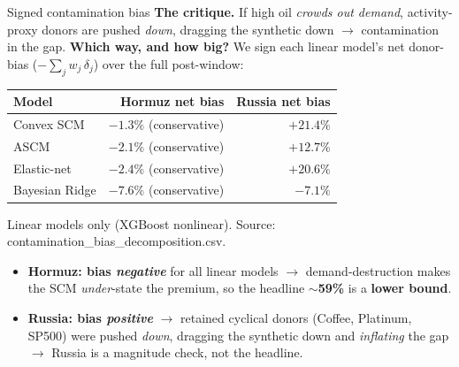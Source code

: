 \documentclass[aspectratio=169,11pt]{beamer}
\newcommand{\smalltext}[1]{{\footnotesize\textcolor{muted}{#1}}}
\newcommand{\hd}[1]{\textbf{#1}}
\begin{document}
\begin{frame}{Signed contamination bias}
  \footnotesize
  \hd{The critique.} If high oil \emph{crowds out demand}, activity-proxy donors are pushed \emph{down},
  dragging the synthetic down $\rightarrow$ contamination in the gap. \hd{Which way, and how big?}
  We sign each linear model's net donor-bias \smalltext{($-\sum_j w_j\,\delta_j$)} over the full post-window:

  \vspace{0.1em}
  \begin{center}
  \begin{tabular}{@{}l r r@{}}
    \toprule
    \hd{Model}     & \hd{Hormuz net bias} & \hd{Russia net bias} \\
    \midrule
    Convex SCM     & $-1.3\%$ \smalltext{(conservative)} & $+21.4\%$ \\
    ASCM           & $-2.1\%$ \smalltext{(conservative)} & $+12.7\%$ \\
    Elastic-net    & $-2.4\%$ \smalltext{(conservative)} & $+20.6\%$ \\
    Bayesian Ridge & $-7.6\%$ \smalltext{(conservative)} & $-7.1\%$ \\
    \bottomrule
  \end{tabular}
  \end{center}
  \smalltext{Linear models only (XGBoost nonlinear). Source: contamination\_bias\_decomposition.csv.}

  \vspace{0.15em}
  \begin{itemize}\setlength\itemsep{0.1em}
    \item \hd{Hormuz: bias \emph{negative}} for all linear models $\rightarrow$ demand-destruction makes the
      SCM \emph{under}-state the premium, so the headline \textcolor{accent}{\bfseries $\sim$59\%} is a \hd{lower bound}.
    \item \hd{Russia: bias \emph{positive}} $\rightarrow$ retained cyclical donors (Coffee, Platinum, SP500)
      were pushed \emph{down}, dragging the synthetic down and \emph{inflating} the gap $\rightarrow$ Russia
      is a magnitude check, not the headline.
  \end{itemize}
\end{frame}
\end{document}

